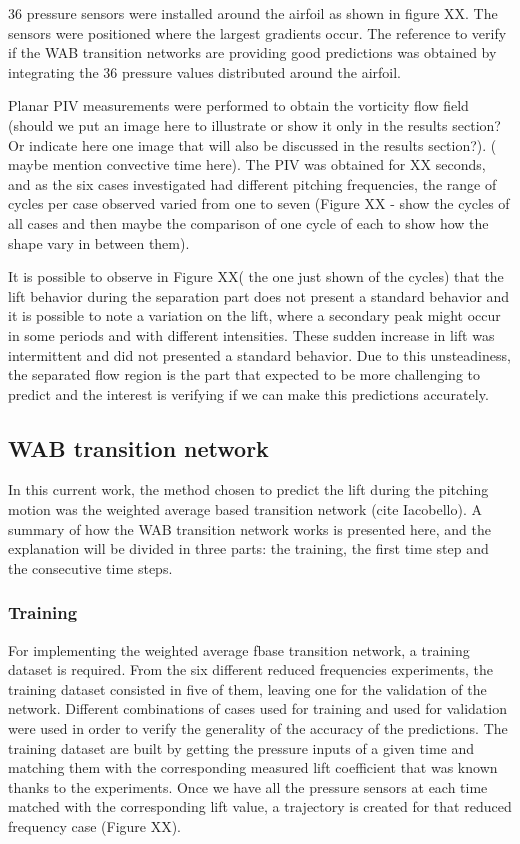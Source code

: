 \documentclass[%
 reprint,
 amsmath,amssymb,
 aps,
]{revtex4-2}
\begin{document}
36 pressure sensors were installed around the airfoil as shown in figure XX. The sensors were positioned where the largest gradients occur. 
The reference to verify if the WAB transition networks are providing good predictions was obtained by integrating the 36 pressure values distributed around the airfoil.

Planar PIV measurements were performed to obtain the vorticity flow field (should we put an image here to illustrate or show it only in the results section? 
Or indicate here one image that will also be discussed in the results section?). ( maybe mention convective time here). 
The PIV was obtained for XX seconds, and as the six cases investigated had different pitching frequencies, the range of cycles per case observed varied from one to seven (Figure XX - show the cycles  of all cases and then maybe the comparison of one cycle of each to show how the shape vary in between them). 

It is possible to observe in Figure XX( the one just shown of the cycles) that the lift behavior during the separation part does not present a standard behavior and it is possible to note a variation on the lift, where a secondary peak might occur in some periods and with different intensities. 
These sudden increase in lift was intermittent and did not presented a standard behavior. 
Due to this unsteadiness, the separated flow region is the part that expected to be more challenging to predict and the interest is verifying if we can make this predictions accurately.

\subsection{\label{sec:level2}WAB transition network}

In this current work, the method chosen to predict the lift during the pitching motion was the weighted average based transition network (cite Iacobello).
A summary of how the WAB transition network works is presented here, and the explanation will be divided in three parts: the training, the first time step and the consecutive time steps.

\subsubsection{Training}
For implementing the weighted average fbase transition network, a training dataset is required. 
From the six different reduced frequencies experiments, the training dataset consisted in five of them, leaving one for the validation of the network.
Different combinations of cases used for training and used for validation were used in order to verify the generality of the accuracy of the predictions.
The training dataset are built by getting the pressure inputs of a given time and matching them with the corresponding measured lift coefficient that was known thanks to the experiments.
Once we have all the pressure sensors at each time matched with the corresponding lift value, a trajectory is created for that reduced frequency case (Figure XX). 
\end{document}
